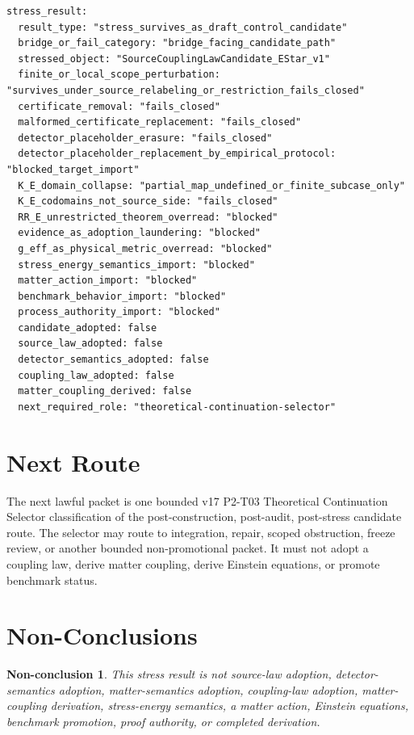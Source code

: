 \documentclass[11pt]{article}
\newtheorem{nonconclusion}{Non-conclusion}
\begin{document}
\begin{verbatim}
stress_result:
  result_type: "stress_survives_as_draft_control_candidate"
  bridge_or_fail_category: "bridge_facing_candidate_path"
  stressed_object: "SourceCouplingLawCandidate_EStar_v1"
  finite_or_local_scope_perturbation: "survives_under_source_relabeling_or_restriction_fails_closed"
  certificate_removal: "fails_closed"
  malformed_certificate_replacement: "fails_closed"
  detector_placeholder_erasure: "fails_closed"
  detector_placeholder_replacement_by_empirical_protocol: "blocked_target_import"
  K_E_domain_collapse: "partial_map_undefined_or_finite_subcase_only"
  K_E_codomains_not_source_side: "fails_closed"
  RR_E_unrestricted_theorem_overread: "blocked"
  evidence_as_adoption_laundering: "blocked"
  g_eff_as_physical_metric_overread: "blocked"
  stress_energy_semantics_import: "blocked"
  matter_action_import: "blocked"
  benchmark_behavior_import: "blocked"
  process_authority_import: "blocked"
  candidate_adopted: false
  source_law_adopted: false
  detector_semantics_adopted: false
  coupling_law_adopted: false
  matter_coupling_derived: false
  next_required_role: "theoretical-continuation-selector"
\end{verbatim}

\section{Next Route}

The next lawful packet is one bounded v17 P2-T03 Theoretical Continuation
Selector classification of the post-construction, post-audit, post-stress
candidate route. The selector may route to integration, repair, scoped
obstruction, freeze review, or another bounded non-promotional packet. It must
not adopt a coupling law, derive matter coupling, derive Einstein equations, or
promote benchmark status.

\section{Non-Conclusions}

\begin{nonconclusion}
This stress result is not source-law adoption, detector-semantics adoption,
matter-semantics adoption, coupling-law adoption, matter-coupling derivation,
stress-energy semantics, a matter action, Einstein equations, benchmark
promotion, proof authority, or completed derivation.
\end{nonconclusion}
\end{document}
